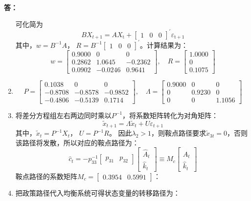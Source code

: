 \documentclass[12pt, a4paper, oneside]{article}
\newcounter{answername}
\newenvironment{answer}{\stepcounter{answername}\par\noindent\textbf{答：}}{\par}
\begin{document}
\begin{CJK*}{UTF8}{gbsn}
\begin{answer}
\begin{enumerate}
$$			$$
			可化简为
			$$BX_{{t}+1}={AX}_{\mathrm{t}}+\left[\begin{array}{lll}1 & 0 & 0\end{array}\right]^{\prime} \varepsilon_{\mathrm{t}+1}$$
			其中，$w=B^{-1} A$， $R=B^{-1}\left[\begin{array}{lll}1 & 0 & 0\end{array}\right]^\prime$。计算结果为：
			$$w=\left[\begin{array}{ccc}0.9000 & 0 & 0 \\ 0.2862 & 1.0645 & -0.2362 \\ 0.0902 & -0.0246 & 0.9641\end{array}\right],\quad R=\left[\begin{array}{c}1.0000 \\ 0 \\ 0.1075\end{array}\right]$$
		\item $$P=\left[\begin{array}{ccc}0.1038 & 0 & 0 \\ -0.8708 & -0.8578 & -0.9852 \\ -0.4806 & -0.5139 & 0.1714\end{array}\right],\quad \Lambda=\left[\begin{array}{ccc}0.9000 & 0 & 0 \\ 0 & 0.9230 & 0 \\ 0 & 0 & 1.1056\end{array}\right]$$
		\item 将差分方程组左右两边同时乘以$P^{-1}$，将系数矩阵转化为对角矩阵：
			$$\tilde{x}_{t+1}=\Lambda \tilde{x}_{t}+U \varepsilon_{t+1}$$
			其中，$\tilde{x}_{t}=P^{-1} X_{t}$， $U=P^{-1} R$。
			因此$\lambda_2>1$，则鞍点路径要求$\tilde{x}_{3t}=0$，否则该路径将发散，所以对应的鞍点路径为：
			$$\hat{c}_{t}=-p_{33}^{-1}\left[\begin{array}{cc}p_{31} & p_{32}\end{array}\right]\left[\begin{array}{l}\hat{A}_{t} \\ \hat{k}_{t}\end{array}\right] \equiv M_{c}\left[\begin{array}{c}\hat{A}_{t} \\ \hat{k}_{t}\end{array}\right]$$
			鞍点路径的系数矩阵$M_c=\left[\begin{array}{cc}0.3954 & 0.5991\end{array}\right]$：
		\item 把政策路径代入均衡系统可得状态变量的转移路径为：

\end{enumerate}
\end{answer}
\end{CJK*}
\end{document}
